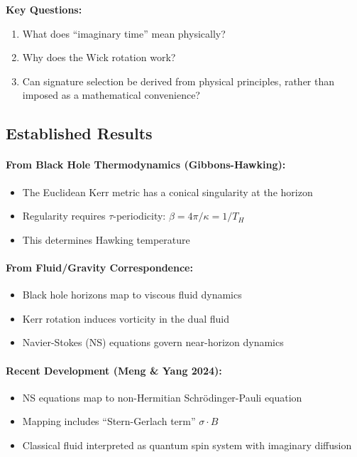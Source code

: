 \documentclass[11pt]{article}
\begin{document}
\textbf{Key Questions:}
\begin{enumerate}
  \item What does ``imaginary time'' mean physically?
  \item Why does the Wick rotation work?
  \item Can signature selection be derived from physical principles, rather than imposed as a mathematical convenience?
\end{enumerate}

\subsection{Established Results}

\paragraph{From Black Hole Thermodynamics (Gibbons-Hawking\cite{GibbonsHawking1977}):}
\begin{itemize}
\item The Euclidean Kerr metric\cite{Kerr1963} has a conical singularity at the horizon
\item Regularity requires $\tau$-periodicity: $\beta = 4\pi/\kappa = 1/T_H$
\item This determines Hawking temperature
\end{itemize}

\paragraph{From Fluid/Gravity Correspondence\cite{FluidGravity2005}:}
\begin{itemize}
\item Black hole horizons map to viscous fluid dynamics
\item Kerr rotation induces vorticity in the dual fluid
\item Navier-Stokes\cite{NavierStokesMillennium} (NS) equations govern near-horizon dynamics
\end{itemize}

\paragraph{Recent Development (Meng \& Yang 2024):}
\begin{itemize}
\item NS equations map to non-Hermitian Schr\"odinger-Pauli equation
\item Mapping includes ``Stern-Gerlach\cite{SternGerlach1924} term'' $\sigma \cdot B$
\item Classical fluid interpreted as quantum spin system with imaginary diffusion
\end{itemize}
\end{document}
